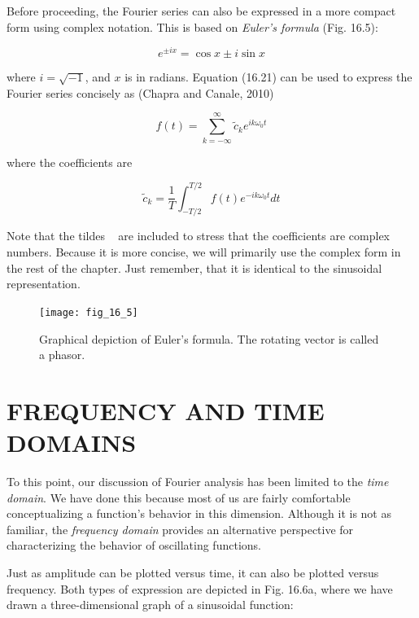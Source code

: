 \documentclass[../main.tex]{subfiles}
\begin{document}
Before proceeding, the Fourier series can also be expressed in a more compact form
using complex notation. This is based on \textit{Euler's formula} (Fig. 16.5):

\begin{equation}
	\tag{16.21}
	e^{\pm ix} = \cos x \pm  i \sin x
\end{equation}

\noindent where $i = \sqrt{-1}$, and $x$ is in radians. Equation (16.21) can be used to express the Fourier
series concisely as (Chapra and Canale, 2010)

\begin{equation}
	\tag{16.22}
	f(t) = \sum _ {k=-\infty} ^ {\infty} \tilde{c}_k e^{i k \omega_0 t} 
\end{equation}

\noindent where the coefficients are

\begin{equation}
	\tag{16.23}
	\tilde{c}_k = \frac{1}{T} \int ^ {T/2} _ {-T/2} f(t) e ^ {-ik \omega_0 t} dt
\end{equation}

Note that the tildes ~ are included to stress that the coefficients are complex numbers.
Because it is more concise, we will primarily use the complex form in the rest of the
chapter. Just remember, that it is identical to the sinusoidal representation.

\begin{figure}[H]
	\centering
	\texttt{[image: fig\_16\_5]}
	\caption{\textsf{Graphical depiction of Euler's formula. The rotating vector is called a phasor.}}
	\label{fig:fig_16_5}
\end{figure}

\label{cha:cha_P_16_3} %
\section{FREQUENCY AND TIME DOMAINS}

\noindent To this point, our discussion of Fourier analysis has been limited to the \textit{time domain}. We
have done this because most of us are fairly comfortable conceptualizing a function's
behavior in this dimension. Although it is not as familiar, the \textit{frequency domain} provides an
alternative perspective for characterizing the behavior of oscillating functions.

Just as amplitude can be plotted versus time, it can also be plotted versus frequency.
Both types of expression are depicted in Fig. 16.6a, where we have drawn a three-dimensional graph of a sinusoidal function:
\end{document}
